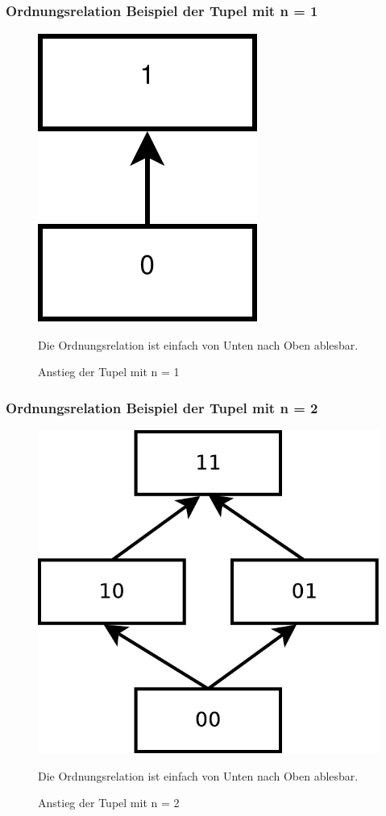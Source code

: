 \documentclass[hyperref={pdfpagelabels=false}]{beamer} %
\begin{document}
  \subsubsection*{Ordnungsrelation Beispiel der Tupel mit n = 1}
  \begin{frame}
    \begin{figure}
      \includegraphics[scale=0.30]{images/m1.pdf}
      \caption{Anstieg der Tupel mit n = 1}
      Die Ordnungsrelation ist einfach von Unten nach Oben ablesbar.
    \end{figure}
  \end{frame}

  \subsubsection*{Ordnungsrelation Beispiel der Tupel mit n = 2}
  \begin{frame}
    \begin{figure}
      \includegraphics[scale=0.30]{images/m2.pdf}
      \caption{Anstieg der Tupel mit n = 2}
      Die Ordnungsrelation ist einfach von Unten nach Oben ablesbar.
    \end{figure}
  \end{frame}
\end{document}
